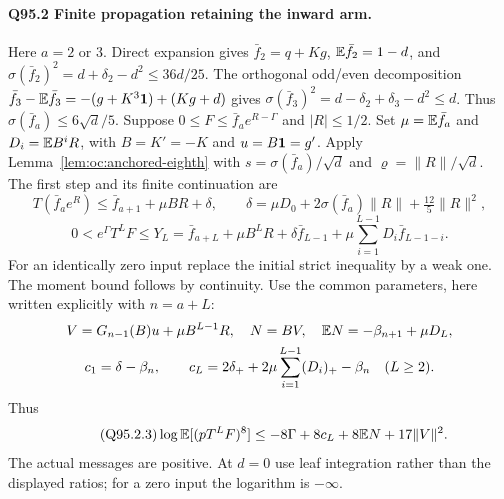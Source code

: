 \paragraph{Q95.2 Finite propagation retaining the inward arm.}
Here \(a=\allowbreak 2\) or \(3\). Direct expansion gives
\(\bar f_2=\allowbreak q+Kg\), \(\mathbb E\bar f_2=\allowbreak 1-d\), and
\(\sigma(\bar f_2)^2=\allowbreak d+\delta_2-d^2\le\allowbreak 36d/25\).
The orthogonal odd/even decomposition
\(\bar f_3-\mathbb E\bar f_3=\allowbreak -(g+K^3\mathbf1)+(Kg+d)\) gives
\(\sigma(\bar f_3)^2=\allowbreak d-\delta_2+\delta_3-d^2\le\allowbreak  d\).
Thus \(\sigma(\bar f_a)\le\allowbreak 6\sqrt d/5\).
Suppose $0\le F\le\bar f_a e^{R-\Gamma}$ and $|R|\le1/2$.
Set $\mu=\mathbb E\bar f_a$ and $D_i=\mathbb E B^iR$, with $B=K'=-K$ and $u=B\mathbf1=g'$.
Apply Lemma~\ref{lem:oc:anchored-eighth} with
$s=\sigma(\bar f_a)/\sqrt d$ and $\varrho=\|R\|/\sqrt d$.
The first step and its finite continuation are
\begin{equation}\tag{Q95.2.1}\label{eq:Q95:2.1}
 T(\bar f_ae^R)\le\bar f_{a+1}+\mu BR+\delta,\qquad
 \delta=\mu D_0+2\sigma(\bar f_a)\|R\|+\tfrac{12}{5}\|R\|^2,
\end{equation}
\begin{equation}\tag{Q95.2.2}\label{eq:Q95:2.2}
 0<e^\Gamma T^LF\le Y_L=\bar f_{a+L}+\mu B^LR
 +\delta\bar f_{L-1}+\mu\sum_{i=1}^{L-1}D_i\bar f_{L-1-i}.
\end{equation}
For an identically zero input replace the initial strict inequality by
a weak one. The moment bound follows by continuity. Use the common
parameters, here written explicitly with $n=a+L$:
\[
\begin{gathered}
 V=G_{n-1}(B)u+\mu B^{L-1}R,\quad N=BV,\quad
 \mathbb E N=-\beta_{n+1}+\mu D_L,\\
 c_1=\delta-\beta_n,\qquad
 c_L=2\delta_++2\mu\sum_{i=1}^{L-1}(D_i)_+-\beta_n\quad(L\ge2).
\end{gathered}
\]
Thus
\begin{equation}\tag{Q95.2.3}\label{eq:Q95:2.3}
 \log\mathbb E[(pT^LF)^8]\le-8\Gamma+8c_L+8\mathbb E N+17\|V\|^2.
\end{equation}
The actual messages are positive. At $d=0$ use leaf integration rather
than the displayed ratios; for a zero input the logarithm is $-\infty$.

